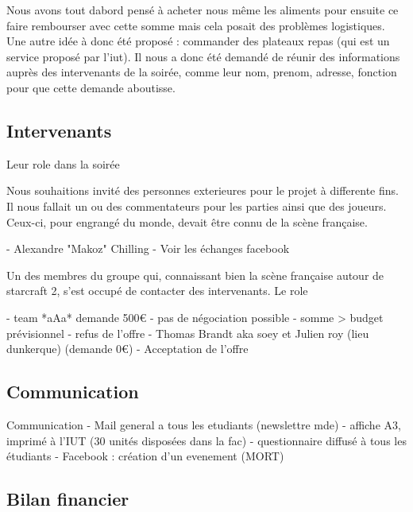   Nous avons tout dabord pensé à acheter nous même les aliments pour
  ensuite ce faire rembourser avec cette somme mais cela posait des
  problèmes logistiques. Une autre idée à donc été proposé : commander des
  plateaux repas (qui est un service proposé par l'iut). Il nous a donc
  été demandé de réunir des informations auprès des intervenants de la
  soirée, comme leur nom, prenom, adresse, fonction pour que cette demande
  aboutisse.

\subsection{Intervenants}%
\label{sub:intervenants}

Leur role dans la soirée

  Nous souhaitions invité des personnes exterieures pour le projet à
  differente fins. Il nous fallait un ou des commentateurs pour les
  parties ainsi que des joueurs. Ceux-ci, pour engrangé du monde, devait
  être connu de la scène française.


- Alexandre "Makoz" Chilling
  - Voir les échanges facebook

Un des membres du groupe qui, connaissant bien la scène française
autour de starcraft 2, s'est occupé de contacter des intervenants. Le
role

- team *aAa* demande 500€
                - pas de négociation possible
                - somme > budget prévisionnel
                - refus de l'offre
- Thomas Brandt aka soey et Julien roy (lieu dunkerque) (demande 0€)
    - Acceptation de l'offre


\subsection{Communication}%
\label{sub:communication}

Communication
        - Mail general a tous les etudiants (newslettre mde)
        - affiche A3, imprimé à l'IUT (30 unités disposées dans la fac)
        - questionnaire diffusé à tous les étudiants
        - Facebook : création d'un evenement (MORT)

\subsection{Bilan financier}%
\label{sub:bilan_financier}

